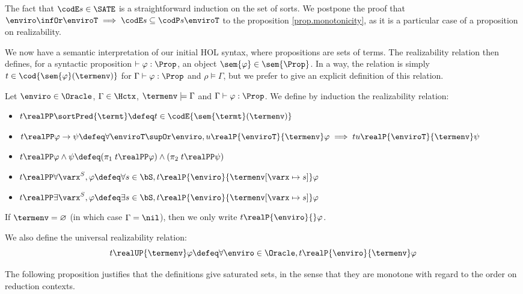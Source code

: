 The fact that $\codE s \in\SATE$ is a straightforward induction on the set of sorts. We postpone the proof that $\enviro\infOr \enviroT \implies \codE s \subseteq \codP s {\enviroT}$ to the proposition \ref{prop.monotonicity}, as it is a particular case of a proposition on realizability.

We now have a semantic interpretation of our initial HOL syntax, where propositions are sets of terms. The realizability relation then defines, for a syntactic proposition $\vdash \varphi : \Prop$, an object $\sem{\varphi} \in \sem{\Prop}$. In a way, the relation is simply $t \in \cod{\sem{\varphi}(\termenv)}$ for $\Gamma\vdash \varphi : \Prop$ and $\rho\models \Gamma$, but we prefer to give an explicit definition of this relation.

\begin{definition}\label{def:real}
  Let $\enviro \in \Oracle$, $\Gamma \in \Hctx$, $\termenv \models \Gamma$ and $\Gamma\vdash \varphi : \Prop$. We define by induction the realizability relation:
  \begin{itemize}
  \item $t \realPP \sortPred{\termt} \defeq t \in \codE{\sem{\termt}(\termenv)}$
  \item $t \realPP \varphi \to \psi \defeq \forall \enviroT \supOr\enviro, u \realP{\enviroT}{\termenv} \varphi \implies tu \realP{\enviroT}{\termenv}\psi$
  \item $t \realPP \varphi \land \psi \defeq (\pi_1\;t \realPP \varphi) \land (\pi_2\;t \realPP \psi)$
  \item $t \realPP \forall \varx^S, \varphi \defeq \forall s \in \bS, t\realP{\enviro}{\termenv[\varx \mapsto s]} \varphi$
  \item $t \realPP \exists \varx^S, \varphi \defeq \exists s \in \bS, t \realP{\enviro}{\termenv[\varx \mapsto s]} \varphi$
  \end{itemize}

  If $\termenv = \varnothing$ (in which case $\Gamma = \nil$), then we only write $t \realP{\enviro}{} \varphi$.

  We also define the universal realizability relation:
  \[t \realUP{\termenv} \varphi \defeq \forall \enviro \in \Oracle, t \realP{\enviro}{\termenv}\varphi\]
\end{definition}

The following proposition justifies that the definitions give saturated sets, in the sense that they are monotone with regard to the order on reduction contexts.


